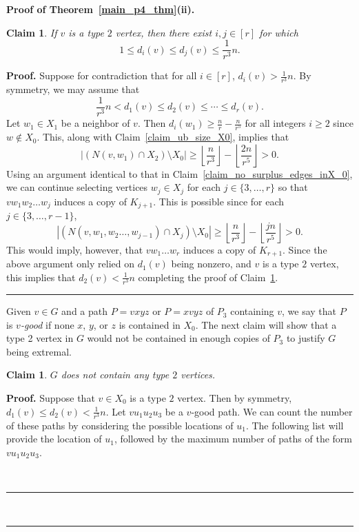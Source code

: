 \documentclass[12pt]{article}
\newtheorem{claim}[thm]{Claim}
\renewenvironment{proof}[1][Proof]{\textbf{#1.} }{\ \rule{0.5em}{0.5em}}
\begin{document}
\begin{proof}[Proof of Theorem~\ref{main_p4_thm}(ii)]
\begin{claim}\label{claim_upper_bound_degree_type_2}
If $v$ is a type $2$ vertex, then there exist $i,j \in [r]$ for which 
\[1 \leq d_i(v) \leq d_j(v) \leq \frac{1}{r^3}n.\]
\end{claim}
\begin{proof}
Suppose for contradiction that for all $i \in [r]$, $d_i(v) > \frac{1}{r^3}n$. By symmetry, we may assume that 
\[
\frac{1}{r^3}n < d_1(v) \leq d_2(v) \leq \cdots \leq d_r(v).
\]
Let $w_1 \in X_1$ be a neighbor of $v$. Then $d_i(w_1) \geq \frac{n}{r} - \frac{n}{r^5}$ for all integers $i \geq 2$ since $w \notin X_0$. This, along with Claim~\ref{claim_ub_size_X0}, implies that
\[ 
| (N(v,w_1) \cap X_2) \setminus X_0 | \geq \left\lfloor\frac{n}{r^3}\right\rfloor - \left\lfloor\frac{2n}{r^5}\right\rfloor > 0. 
\]
Using an argument identical to that in Claim~\ref{claim_no_surplus_edges_inX_0}, we can continue selecting vertices $w_j \in X_j$ for each $j \in \{3,\dots,r\}$ so that $vw_1w_2\dots w_j$ induces a copy of $K_{j+1}$. This is possible since for each $j \in \{3,\dots,r-1\}$, 
\[ 
| (N(v,w_1,w_2\dots,w_{j-1}) \cap X_j) \setminus X_0 | \geq \left\lfloor\frac{n}{r^3}\right\rfloor - \left\lfloor\frac{jn}{r^5}\right\rfloor > 0.
\]
This would imply, however, that $vw_1\dots w_r$ induces a copy of $K_{r+1}$. Since the above argument only relied on $d_1(v)$ being nonzero, and $v$ is a type $2$ vertex, this implies that $d_2(v) < \frac{1}{r^3} n$ completing the proof of Claim~\ref{claim_upper_bound_degree_type_2}. 
\end{proof}

Given $v \in G$ and a  path $P = vxyz$ or $P = xvyz$ of $P_3$ containing $v$, we say that $P$ is \emph{$v$-good} if none $x$, $y$, or $z$ is contained in $X_0$. The next claim will show that a type 2 vertex in $G$ would not be contained in enough copies of $P_3$ to justify $G$ being extremal. 

\begin{claim}\label{claim_no_type_2}
$G$ does not contain any type $2$ vertices. 
\end{claim}

\begin{proof}
Suppose that $v \in X_0$ is a type $2$ vertex. Then by symmetry, $d_1(v) \leq d_2(v) < \frac{1}{r^3}n$. Let $vu_1u_2u_3$ be a $v$-good path. We can count the number of these paths by considering the possible locations of $u_1$. The following list will provide the location of $u_1$, followed by the maximum number of paths of the form $vu_1u_2u_3$.


\end{proof}
\end{proof}
\end{document}
